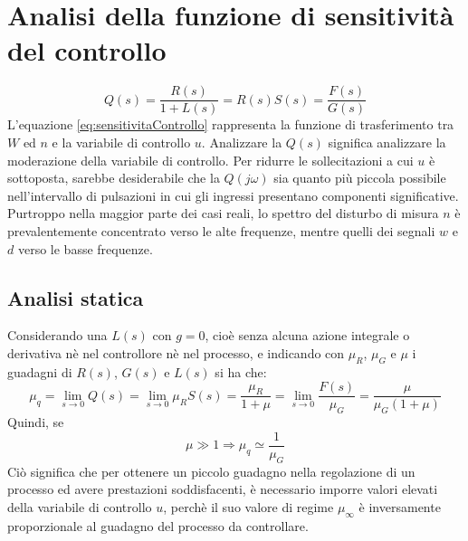 \documentclass[a4paper]{report}
\begin{document}
\section{Analisi della funzione di sensitivit\`a del controllo}
\begin{equation}\label{eq:sensitivitaControllo}
  Q(s) = \dfrac{R(s)}{1 + L(s)} = R(s) S(s) = \dfrac{F(s)}{G(s)}
\end{equation}
L'equazione \ref{eq:sensitivitaControllo} rappresenta la funzione di
trasferimento tra $W$ ed $n$ e la variabile di controllo
$u$. Analizzare la $Q(s)$ significa analizzare la moderazione della
variabile di controllo. Per ridurre le sollecitazioni a cui $u$ \`e
sottoposta, sarebbe desiderabile che la $Q(j \omega)$ sia quanto pi\`u
piccola possibile nell'intervallo di pulsazioni in cui gli ingressi
presentano componenti significative. Purtroppo nella maggior parte dei
casi reali, lo spettro del disturbo di misura $n$ \`e prevalentemente
concentrato verso le alte frequenze, mentre quelli dei segnali $w$ e
$d$ verso le basse frequenze.

\subsection{Analisi statica}
Considerando una $L(s)$ con $g = 0$, cio\`e senza alcuna azione
integrale o derivativa n\`e nel controllore n\`e nel processo, e
indicando con $\mu_R$, $\mu_G$ e $\mu$ i guadagni di $R(s)$, $G(s)$ e
$L(s)$ si ha che:
\[
\mu_q = \lim_{s \to 0} Q(s) = \lim_{s \to 0} \mu_R S(s) =
\dfrac{\mu_R}{1 + \mu} = \lim_{s \to 0} \dfrac{F(s)}{\mu_G} =
\dfrac{\mu}{\mu_G(1 + \mu)}
\]
Quindi, se
\[
\mu \gg 1 \Rightarrow \mu_q \simeq \dfrac{1}{\mu_G}
\]
Ci\`o significa che per ottenere un piccolo guadagno nella regolazione
di un processo ed avere prestazioni soddisfacenti, \`e necessario
imporre valori elevati della variabile di controllo $u$, perch\`e il
suo valore di regime $\mu_{\infty}$ \`e inversamente proporzionale al
guadagno del processo da controllare.
\end{document}
